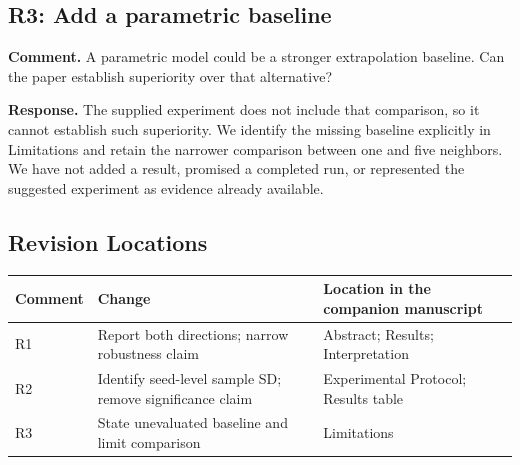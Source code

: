 \documentclass[
  10pt,
  letterpaper,
]{article}
\newcounter{none} %
\begin{document}
\subsection{R3: Add a parametric
baseline}\label{r3-add-a-parametric-baseline}

\textbf{Comment.} A parametric model could be a stronger extrapolation
baseline. Can the paper establish superiority over that alternative?

\textbf{Response.} The supplied experiment does not include that
comparison, so it cannot establish such superiority. We identify the
missing baseline explicitly in Limitations and retain the narrower
comparison between one and five neighbors. We have not added a result,
promised a completed run, or represented the suggested experiment as
evidence already available.

\subsection{Revision Locations}\label{revision-locations}

{\def\LTcaptype{none} %
\begin{longtable}[]{@{}
  >{\raggedright\arraybackslash}p{}
  >{\raggedright\arraybackslash}p{}
  >{\raggedright\arraybackslash}p{}@{}}
\toprule\noalign{}
\begin{minipage}[b]{\linewidth}\raggedright
Comment
\end{minipage} & \begin{minipage}[b]{\linewidth}\raggedright
Change
\end{minipage} & \begin{minipage}[b]{\linewidth}\raggedright
Location in the companion manuscript
\end{minipage} \\
\midrule\noalign{}
\endhead
\bottomrule\noalign{}
\endlastfoot
R1 & Report both directions; narrow robustness claim & Abstract;
Results; Interpretation \\
R2 & Identify seed-level sample SD; remove significance claim &
Experimental Protocol; Results table \\
R3 & State unevaluated baseline and limit comparison & Limitations \\
\end{longtable}
}
\end{document}
